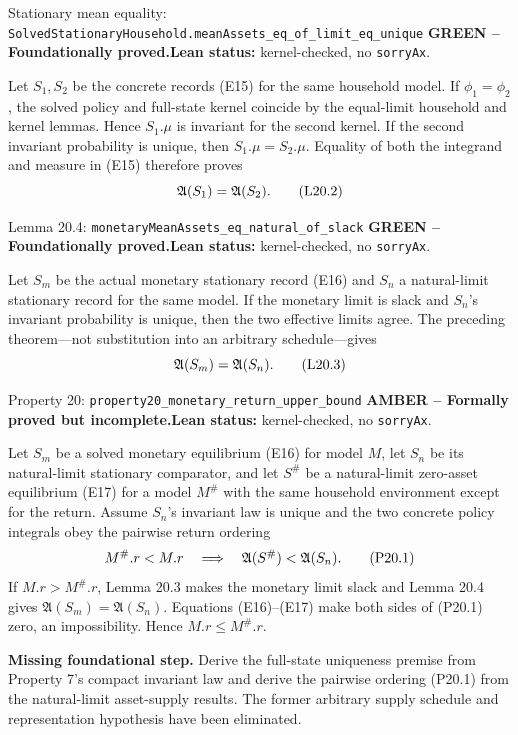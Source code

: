\documentclass[11pt]{article}
\newcommand{\leanname}[1]{\nolinkurl{#1}}
\newcommand{\eqP}[1]{\refstepcounter{equation}\tag{P#1}}
\newcommand{\eqL}[1]{\refstepcounter{equation}\tag{L#1}}
\newcommand{\formalcheck}{\textbf{Lean status:} kernel-checked, no \texttt{sorryAx}.}
\newcommand{\missing}[1]{\par\smallskip\textbf{Missing foundational step.} #1}
\newcommand{\greenstatus}{\textcolor{proved}{\textbf{GREEN -- Foundationally proved.}}}
\newcommand{\amberstatus}{\textcolor{conditional}{\textbf{AMBER -- Formally proved but incomplete.}}}
\begin{document}
\begin{greenbox}{Stationary mean equality:
\leanname{SolvedStationaryHousehold.meanAssets_eq_of_limit_eq_unique}}
\greenstatus\quad\formalcheck

Let \(S_1,S_2\) be the concrete records (E15) for the same household model.
If \(\phi_1=\phi_2\), the solved policy and full-state kernel coincide by the
equal-limit household and kernel lemmas.  Hence \(S_1.\mu\) is invariant for
the second kernel.  If the second invariant probability is unique, then
\(S_1.\mu=S_2.\mu\).  Equality of both the integrand and measure in (E15)
therefore proves
\begin{equation}
 \mathfrak A(S_1)=\mathfrak A(S_2). \eqL{20.2}\label{L20.2}
\end{equation}
\end{greenbox}

\begin{greenbox}{Lemma 20.4: \leanname{monetaryMeanAssets_eq_natural_of_slack}}
\greenstatus\quad\formalcheck

Let \(S_m\) be the actual monetary stationary record (E16) and \(S_n\) a
natural-limit stationary record for the same model.  If the monetary limit is
slack and \(S_n\)'s invariant probability is unique, then the two effective
limits agree.  The preceding theorem—not substitution into an arbitrary
schedule—gives
\begin{equation}
 \mathfrak A(S_m)=\mathfrak A(S_n). \eqL{20.3}\label{L20.3}
\end{equation}
\end{greenbox}

\begin{amberbox}{Property 20: \leanname{property20_monetary_return_upper_bound}}
\amberstatus\quad\formalcheck

Let \(S_m\) be a solved monetary equilibrium (E16) for model \(M\), let
\(S_n\) be its natural-limit stationary comparator, and let \(S^\#\) be a
natural-limit zero-asset equilibrium (E17) for a model \(M^\#\) with the same
household environment except for the return.  Assume \(S_n\)'s invariant law
is unique and the two concrete policy integrals obey the pairwise return
ordering
\begin{equation}
 M^\#.r<M.r\quad\Longrightarrow\quad
 \mathfrak A(S^\#)<\mathfrak A(S_n). \eqP{20.1}\label{P20.1}
\end{equation}
If \(M.r>M^\#.r\), Lemma 20.3 makes the monetary limit slack and Lemma 20.4
gives \(\mathfrak A(S_m)=\mathfrak A(S_n)\).  Equations (E16)--(E17) make both
sides of (P20.1) zero, an impossibility.  Hence \(M.r\le M^\#.r\).

\missing{Derive the full-state uniqueness premise from Property 7's compact
invariant law and derive the pairwise ordering (P20.1) from the natural-limit
asset-supply results.  The former arbitrary supply schedule and representation
hypothesis have been eliminated.}
\end{amberbox}
\end{document}

